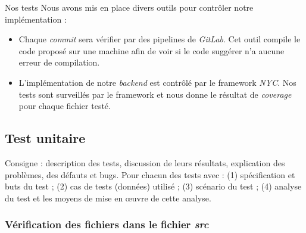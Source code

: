 \newenvironment{mytest}[4]
{
    \begin{center}
        \centering
        \begin{tabular}[h]{|m{4cm}|m{12cm}|} 
            \hline
            \rowcolor[HTML]{F8B400}
            \textbf{But} & #1 \\
            \hline
            \hline
            \rowcolor[HTML]{F7F7F7}
            Entrée & #2 \\
            \hline
            \rowcolor[HTML]{F7F7F7}
            Scénario & #3 \\
            \hline
            \rowcolor[HTML]{F7F7F7}
            Analyse du test & #4 \\
            \hline
        \end{tabular}
    \end{center}  
}

\section{Nos tests}
Nous avons mis en place divers outils pour contrôler notre implémentation :
\begin{itemize}
    \item Chaque \emph{commit} sera vérifier par des pipelines de \emph{GitLab}. Cet outil compile le code proposé sur une machine afin de voir si le code suggérer n'a aucune erreur de compilation.
    \item L'implémentation de notre \emph{backend} est contrôlé par le framework \emph{NYC}. Nos tests sont surveillés par le framework et nous donne le résultat de \emph{coverage} pour chaque fichier testé.
\end{itemize}

\subsection{Test unitaire}

Consigne : description des tests, discussion de leurs résultats, explication des problèmes, des défauts et bugs. Pour chacun des tests avec : (1) spécification et buts du test ;
(2) cas de tests (données) utilisé ; (3) scénario du test ; (4) analyse du test et les moyens de mise en œuvre de cette analyse.

\subsubsection{Vérification des fichiers dans le fichier \emph{src}}

